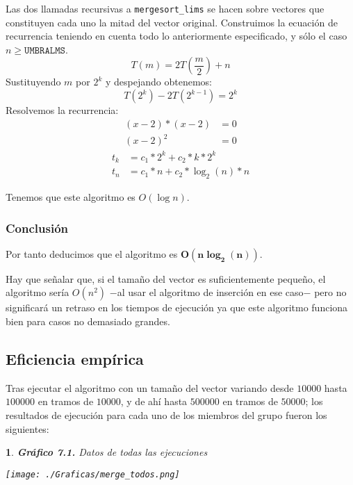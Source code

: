\documentclass[10pt, a4paper]{article}
\theoremstyle{theorem-style}
\newtheorem*{datos}{}
\theoremstyle{theorem-style}
\theoremstyle{definition-style}
\theoremstyle{remark-style}
\theoremstyle{example-style}
\theoremstyle{definition-style}
\theoremstyle{remark-style}
\begin{document}
Las dos llamadas recursivas a \texttt{mergesort\_lims} se hacen sobre vectores que constituyen cada uno la mitad del vector original. Construimos la ecuación de recurrencia teniendo en cuenta todo lo anteriormente especificado, y sólo el caso $n \geq \texttt{UMBRALMS}$.
$$ T(m) = 2T(\frac{m}{2}) +n $$
Sustituyendo $m$ por $2^k$  y despejando obtenemos:
$$ T(2^k) - 2T(2^{k-1} ) = 2^k $$
Resolvemos la recurrencia:
\begin{align*}
(x-2) * (x-2) &= 0\\
(x-2)^2 &= 0
\end{align*}
\begin{align*}
t_{k} &= c_{1}*2^k + c_{2}*k*2^k \\
t_{n} &= c_{1}*n+c_{2}*\log_{2}(n)*n
\end{align*}

Tenemos que este algoritmo es $O(\log n)$.

\subsubsection*{Conclusión}

Por tanto deducimos que el algoritmo es $\boldsymbol{O(n\log_{2}(n))}$.

Hay que señalar que, si el tamaño del vector es suficientemente pequeño, el algoritmo sería $O(n^2)$ $-$al usar el algoritmo de inserción en ese caso$-$ pero no significará un retraso en los tiempos de ejecución ya que este algoritmo funciona bien para casos no demasiado grandes.

\subsection{Eficiencia empírica}

Tras ejecutar el algoritmo con un tamaño del vector variando desde $10000$ hasta $100000$ en tramos de $10000$, y de ahí hasta $500000$ en tramos de $50000$; los resultados de ejecución para cada uno de los miembros del grupo fueron los siguientes:
\pagebreak
\begin{datos}\hspace{-0.2cm}
	{\bf\sffamily Gráfico 7.1.} {\sffamily Datos de todas las ejecuciones}\\
	\vspace{-0.7cm}
	\begin{center}
		\texttt{[image: ./Graficas/merge\_todos.png]}
	\end{center}
\end{datos}
\end{document}
